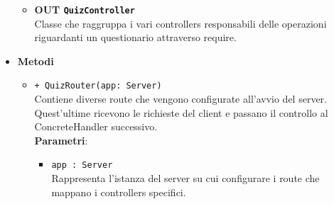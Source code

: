 \begin{itemize}
\begin{itemize}
		\item \textbf{OUT \texttt{QuizController}} \\
			Classe che raggruppa i vari controllers responsabili delle operazioni riguardanti un questionario attraverso require.
		\end{itemize}
		\item \textbf{Metodi} 
		\begin{itemize}
		\item \texttt{+ QuizRouter(app: Server)} \\
		Contiene diverse route che vengono configurate all’avvio del server. Quest’ultime ricevono le richieste del client e passano il controllo al ConcreteHandler successivo. \\
		\textbf{Parametri}:
		\begin{itemize}
		\item \texttt{app : Server} \\
		Rappresenta l’istanza del server su cui configurare i route che mappano i controllers specifici.
		\end{itemize}
		\end{itemize}
	\end{itemize}